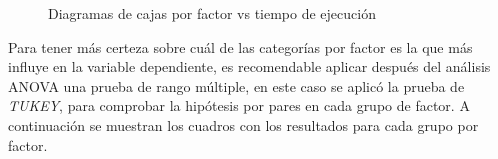\documentclass{article}
\begin{document}
\begin{figure}

\caption{Diagramas de cajas por factor vs tiempo de ejecución}
\label{fig:Fig2}
\end{figure}



%
%
%
%
 


Para tener más certeza sobre cuál de las categorías por factor es la que más influye en la variable dependiente, es recomendable aplicar después del análisis ANOVA una prueba de rango múltiple, en este caso se aplicó la prueba de \textit{TUKEY}, para comprobar la hipótesis por pares en cada grupo de factor. A continuación se muestran los cuadros con los resultados para cada grupo por factor.
\end{document}
